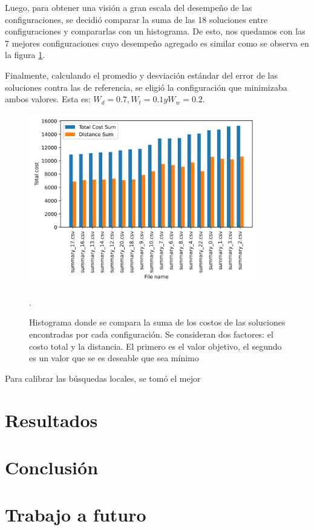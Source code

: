 \documentclass{article}
\begin{document}
  Luego, para obtener una visión a gran escala del desempeño de las configuraciones, se decidió comparar la suma de las 18 soluciones entre configuraciones y compararlas con un histograma. De esto, nos quedamos con las 7 mejores configuraciones cuyo desempeño agregado es similar como se observa en la figura \ref{cmphistogram}.

  Finalmente, calculando el promedio y desviación estándar del error de las soluciones contra las de referencia, se eligió la configuración que minimizaba ambos valores. Esta es: $W_d = 0.7, W_t = 0.1 y W_w = 0.2$.

  \begin{figure}
    \centering
    \includegraphics[width=10cm]{resources/tunning/total_cost_histogram_used.png}
    \caption{Histograma donde se compara la suma de los costos de las soluciones encontradas por cada configuración. Se consideran dos factores: el costo total y la distancia. El primero es el valor objetivo, el segundo es un valor que se es deseable que sea mínimo}.
    \label{cmphistogram}
  \end{figure}

  Para calibrar las búsquedas locales, se tomó el mejor

  \section*{Resultados}

  \section*{Conclusión}

  \section*{Trabajo a futuro}
\end{document}
